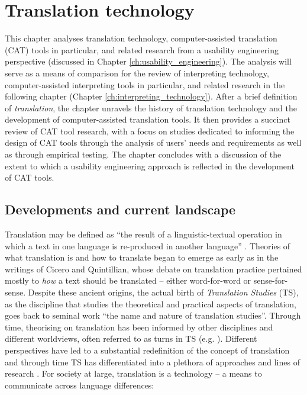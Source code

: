 \chapter{Translation technology}\label{ch:translation_technology}

\begin{sloppypar}
This chapter analyses translation technology, computer-assisted translation (CAT) tools in particular, and related research from a usability engineering perspective (discussed in Chapter \ref{ch:usability_engineering}). The analysis will serve as a means of comparison for the review of interpreting technology, computer-assisted interpreting tools in particular, and related research in the following chapter (Chapter \ref{ch:interpreting_technology}). After a brief definition of \textit{translation}, the chapter unravels the history of translation technology and the development of computer-assisted translation tools. It then provides a succinct review of CAT tool research, with a focus on studies dedicated to informing the design of CAT tools through the analysis of users’ needs and requirements as well as through empirical testing. The chapter concludes with a discussion of the extent to which a usability engineering approach is reflected in the development of CAT tools.
\end{sloppypar}

\section{Developments and current landscape}

Translation may be defined as ``the result of a linguistic-textual operation in which a text in one language is re-produced in another language'' \citep[1]{house2014translation}. Theories of what translation is and how to translate began to emerge as early as in the writings of Cicero and Quintillian, whose debate on translation practice pertained mostly to \textit{how} a text should be translated – either word-for-word or sense-for-sense. Despite these ancient origins, the actual birth of \textit{Translation Studies} (TS), as the discipline that studies the theoretical and practical aspects of translation, goes back to  seminal work ``the name and nature of translation studies''. Through time, theorising on translation has been informed by other disciplines and different worldviews, often referred to as turns in TS (e.g. \cite{snell2006turns}). Different perspectives have led to a substantial redefinition of the concept of translation \citep{cheung2011reconceptualizing} and through time TS has differentiated into a plethora of approaches and lines of research \citep{baker2019}. For society at large, translation is a technology – a means to communicate across language differences:

